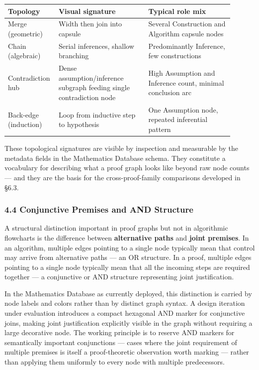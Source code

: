 \documentclass[
  11pt]{article}
\begin{document}
\begin{longtable}[]{@{}>{\raggedright\arraybackslash}p{0.16\linewidth}>{\raggedright\arraybackslash}p{0.38\linewidth}>{\raggedright\arraybackslash}p{0.36\linewidth}@{}}
\toprule\noalign{}
Topology & Visual signature & Typical role mix \\
\midrule\noalign{}
\endhead
\bottomrule\noalign{}
\endlastfoot
Merge (geometric) & Width then join into capsule & Several Construction
and Algorithm capsule nodes \\
Chain (algebraic) & Serial inferences, shallow branching & Predominantly
Inference, few constructions \\
Contradiction hub & Dense assumption/inference subgraph feeding single
contradiction node & High Assumption and Inference count, minimal
conclusion arc \\
Back-edge (induction) & Loop from inductive step to hypothesis & One
Assumption node, repeated inferential pattern \\
\end{longtable}

These topological signatures are visible by inspection and measurable by
the metadata fields in the Mathematics Database schema. They constitute
a vocabulary for describing what a proof graph looks like beyond raw
node counts --- and they are the basis for the cross-proof-family
comparisons developed in §6.3.

\hypertarget{44-conjunctive-premises-and-and-structure}{%
\subsubsection{4.4 Conjunctive Premises and AND
Structure}\label{44-conjunctive-premises-and-and-structure}}

A structural distinction important in proof graphs but not in
algorithmic flowcharts is the difference between \textbf{alternative
paths} and \textbf{joint premises}. In an algorithm, multiple edges
pointing to a single node typically mean that control may arrive from
alternative paths --- an OR structure. In a proof, multiple edges
pointing to a single node typically mean that all the incoming steps are
required together --- a conjunctive or AND structure representing joint
justification.

In the Mathematics Database as currently deployed, this distinction is
carried by node labels and colors rather than by distinct graph syntax.
A design iteration under evaluation introduces a compact hexagonal AND
marker for conjunctive joins, making joint justification explicitly
visible in the graph without requiring a large decorative node. The
working principle is to reserve AND markers for semantically important
conjunctions --- cases where the joint requirement of multiple premises
is itself a proof-theoretic observation worth marking --- rather than
applying them uniformly to every node with multiple predecessors.
\end{document}
